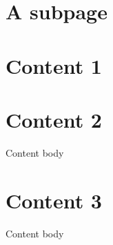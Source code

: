 \chapter{A subpage}
\label{\detokenize{subfolder/asubpage:a-subpage}}\label{\detokenize{subfolder/asubpage::doc}}

\chapter{Content 1}
\label{\detokenize{content1:content-1}}\label{\detokenize{content1::doc}}

\chapter{Content 2}
\label{\detokenize{content2:content-2}}\label{\detokenize{content2::doc}}
Content body


\chapter{Content 3}
\label{\detokenize{content3:content-3}}\label{\detokenize{content3::doc}}
Content body







\renewcommand{\indexname}{Index}
\printindex
